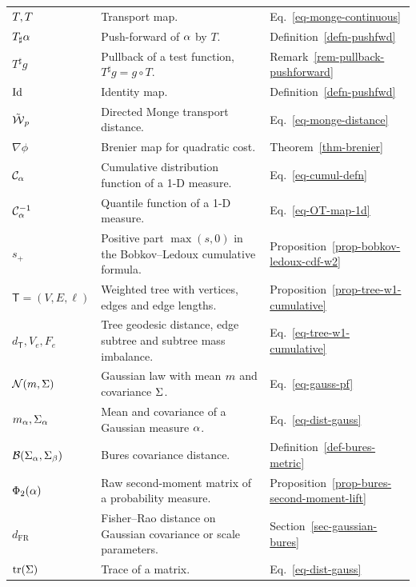 {\begin{longtable}{>{\raggedright\arraybackslash}p{}
                  >{\raggedright\arraybackslash}p{}
                  >{\raggedright\arraybackslash}p{}}
\hline
\multicolumn{3}{l}{\textbf{Monge maps, one-dimensional OT and Gaussians}}\\
\hline
$T,T$ & Transport map. & Eq.~\eqref{eq-monge-continuous} \\
$T_\sharp\alpha$ & Push-forward of $\alpha$ by $T$. & Definition~\ref{defn-pushfwd} \\
$T^\sharp g$ & Pullback of a test function, $T^\sharp g=g\circ T$. & Remark~\ref{rem-pullback-pushforward} \\
$\mathrm{Id}$ & Identity map. & Definition~\ref{defn-pushfwd} \\
$\tilde{\operatorname{\mathcal{W}}}_p$ & Directed Monge transport distance. & Eq.~\eqref{eq-monge-distance} \\
$\nabla\phi$ & Brenier map for quadratic cost. & Theorem~\ref{thm-brenier} \\
$\mathcal{C}_{\alpha}$ & Cumulative distribution function of a 1-D measure. & Eq.~\eqref{eq-cumul-defn} \\
$\mathcal{C}_{\alpha}^{-1}$ & Quantile function of a 1-D measure. & Eq.~\eqref{eq-OT-map-1d} \\
$s_+$ & Positive part $\max(s,0)$ in the Bobkov--Ledoux cumulative formula. & Proposition~\ref{prop-bobkov-ledoux-cdf-w2} \\
$\mathsf T=(V,E,\ell)$ & Weighted tree with vertices, edges and edge lengths. & Proposition~\ref{prop-tree-w1-cumulative} \\
$d_{\mathsf T},V_e,F_e$ & Tree geodesic distance, edge subtree and subtree mass imbalance. & Eq.~\eqref{eq-tree-w1-cumulative} \\
$\mathcal{N}(m,\Sigma)$ & Gaussian law with mean $m$ and covariance $\Sigma$. & Eq.~\eqref{eq-gauss-pf} \\
$m_\alpha,\Sigma_\alpha$ & Mean and covariance of a Gaussian measure $\alpha$. & Eq.~\eqref{eq-dist-gauss} \\
$\mathcal{B}(\Sigma_\alpha,\Sigma_\beta)$ & Bures covariance distance. & Definition~\ref{def-bures-metric} \\
$\Phi_2(\alpha)$ & Raw second-moment matrix of a probability measure. & Proposition~\ref{prop-bures-second-moment-lift} \\
$d_{\mathrm{FR}}$ & Fisher--Rao distance on Gaussian covariance or scale parameters. & Section~\ref{sec-gaussian-bures} \\
$\operatorname{tr}(\Sigma)$ & Trace of a matrix. & Eq.~\eqref{eq-dist-gauss} \\


\end{longtable}}

